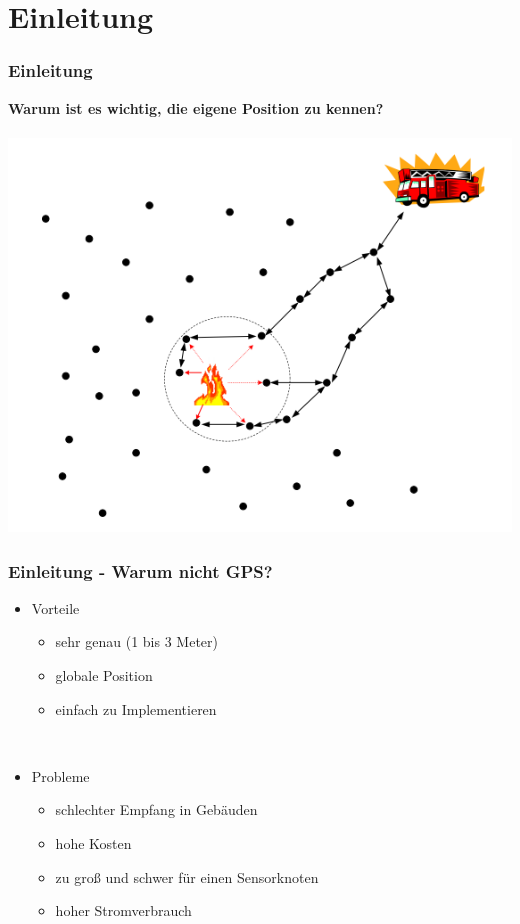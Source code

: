 \section{Einleitung}
\label{sec:einleitung}

\begin{frame}
  \frametitle{Einleitung}

  \begin{center}
    \textbf{Warum ist es wichtig, die eigene Position zu kennen?}\\~\\

    \includegraphics[scale=0.35]{img/lokalisierung_1}
  \end{center}
\end{frame}

\begin{frame}
  \frametitle{Einleitung - Warum nicht GPS?}

  \begin{itemize}
  \item Vorteile
    \begin{itemize}
    \item sehr genau (1 bis 3 Meter)
    \item globale Position
    \item einfach zu Implementieren
    \end{itemize}
  ~\\
  \item Probleme
    \begin{itemize}
    \item schlechter Empfang in Gebäuden
    \item hohe Kosten
    \item zu groß und schwer für einen Sensorknoten
    \item hoher Stromverbrauch
    \end{itemize}
  \end{itemize}
\end{frame}
